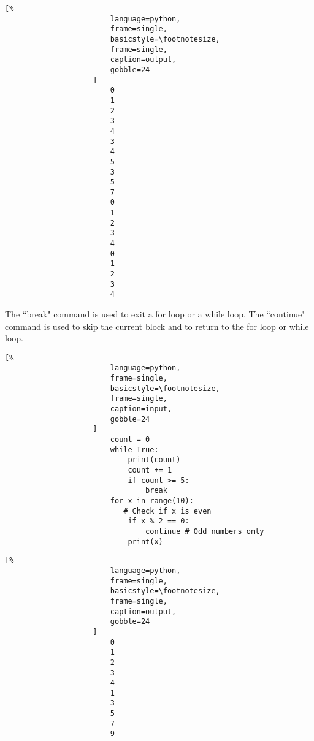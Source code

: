 \documentclass[crop=false,class=article,oneside]{standalone}
\begin{document}
                \begin{minipage}[t]{.48\textwidth}
                    \centering
                    \begin{lstlisting}[%
                        language=python,
                        frame=single,
                        basicstyle=\footnotesize,
                        frame=single,
                        caption=output,
                        gobble=24
                    ]
                        0
                        1
                        2
                        3
                        4
                        3
                        4
                        5
                        3
                        5
                        7
                        0
                        1
                        2
                        3
                        4
                        0
                        1
                        2
                        3
                        4
                    \end{lstlisting}
                \end{minipage}
                The ``break" command is used to exit a for loop or a
                while loop. The ``continue" command is used to skip
                the current block and to return to the for loop or
                while loop.
                \newpage
                \begin{minipage}[t]{.48\textwidth}
                    \centering
                    \begin{lstlisting}[%
                        language=python,
                        frame=single,
                        basicstyle=\footnotesize,
                        frame=single,
                        caption=input,
                        gobble=24
                    ]
                        count = 0
                        while True:
                            print(count)
                            count += 1
                            if count >= 5:
                                break
                        for x in range(10):
                           # Check if x is even
                            if x % 2 == 0:
                                continue # Odd numbers only
                            print(x)
                    \end{lstlisting}
                \end{minipage}\hfill
                \begin{minipage}[t]{.48\textwidth}
                    \centering
                    \begin{lstlisting}[%
                        language=python,
                        frame=single,
                        basicstyle=\footnotesize,
                        frame=single,
                        caption=output,
                        gobble=24
                    ]
                        0
                        1
                        2
                        3
                        4
                        1
                        3
                        5
                        7
                        9
                    \end{lstlisting}
                \end{minipage}
\end{document}
